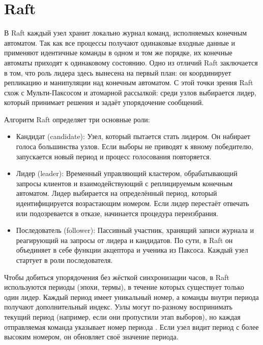 
\section{Raft}

В Raft каждый узел хранит локально журнал команд, исполняемых конечным автоматом.
Так как все процессы получают одинаковые входные данные и применяют идентичные
команды в одном и том же порядке, их конечные автоматы приходят к одинаковому
состоянию. Одно из отличий Raft заключается в том, что роль лидера здесь
вынесена на первый план: он координирует репликацию и манипуляции над конечным
автоматом. С этой точки зрения Raft схож с Мульти-Паксосом и атомарной рассылкой:
среди узлов выбирается лидер, который принимает решения и задаёт упорядочение
сообщений.

Алгоритм Raft определяет три основные роли:

\begin{itemize}
    \item Кандидат (candidate): Узел, который пытается стать лидером. Он набирает
        голоса большинства узлов. Если выборы не приводят к явному победителю,
        запускается новый период и процесс голосования повторяется.
    \item Лидер (leader): Временный управляющий кластером, обрабатывающий запросы
        клиентов и взаимодействующий с реплицируемым конечным автоматом. Лидер
        выбирается на определённый период, который идентифицируется возрастающим
        номером. Если лидер перестаёт отвечать или подозревается в отказе,
        начинается процедура переизбрания.
    \item Последователь (follower): Пассивный участник, хранящий записи журнала
        и реагирующий на запросы от лидера и кандидатов. По сути, в Raft он
        объединяет в себе функции акцептора и ученика из Паксоса. Каждый узел
        стартует в роли последователя.
\end{itemize}

Чтобы добиться упорядочения без жёсткой синхронизации часов, в Raft используются
периоды (эпохи, термы), в течение которых существует только один лидер. Каждый
период имеет уникальный номер, а команды внутри периода получают дополнительный
индекс. Узлы могут по-разному воспринимать текущий период (например, если они
пропустили этап выборов), но каждая отправляемая команда указывает номер
периода \cite{ongario2014}. Если узел видит период с более высоким номером, он
обновляет своё значение периода.

